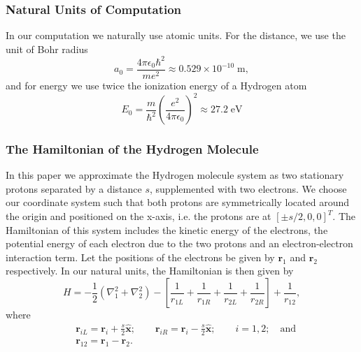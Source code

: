 \documentclass[twoside]{article}
\newcommand{\unit}[1]{\ensuremath{\; \mathrm{#1}}}
\newcommand{\bfr}{\ensuremath{\mathbf{r}}}
\begin{document}
\subsubsection*{Natural Units of Computation}
In our computation we naturally use atomic units. For the distance, we use the unit of Bohr radius
\begin{equation}
a_0 = \frac{4\pi \epsilon_0 \hbar^2}{me^2} \approx 0.529 \times 10^{-10} \unit{m},
\end{equation}
and for energy we use twice the ionization energy of a Hydrogen atom
\begin{equation}
E_0 = \frac{m}{\hbar^2} \left(\frac{e^2}{4\pi \epsilon_0}\right)^2 \approx 27.2 \unit{eV} 
\end{equation}

\subsubsection*{The Hamiltonian of the Hydrogen Molecule}
In this paper we approximate the Hydrogen molecule system as two stationary protons separated by a distance $s$, supplemented with two electrons. We choose our coordinate system such that both protons are symmetrically located around the origin and positioned on the x-axis, i.e. the protons are at $[\pm s/2,0,0]^T$. The Hamiltonian of this system includes the kinetic energy of the electrons, the potential energy of each electron due to the two protons and an electron-electron interaction term. Let the positions of the electrons be given by $\bfr_1$ and $\bfr_2$ respectively. In our natural units, the Hamiltonian is then given by
\begin{equation}
H = -\frac{1}{2} (\nabla_1^2 + \nabla_2^2) - \left[ \frac{1}{r_{1L}} + \frac{1}{r_{1R}} + \frac{1}{r_{2L}} + \frac{1}{r_{2R}}  \right] + \frac{1}{r_{12}},
\end{equation}
where
\begin{equation}
\begin{split}
&\bfr_{iL} = \bfr_i + \frac{s}{2} \mathbf{\hat{x}}; \quad\quad \bfr_{iR} = \bfr_i - \frac{s}{2} \mathbf{\hat{x}}; \quad \quad i=1,2; \quad \mbox{and} \\
&\bfr_{12} = \bfr_1 - \bfr_2.
\end{split}
\end{equation}
\end{document}
